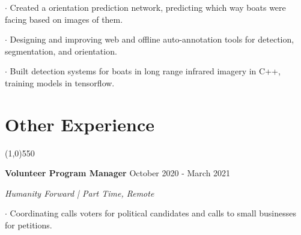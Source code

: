 \documentclass[11pt]{article} %
\begin{document}
		$\boldsymbol{\cdot}$ Created a orientation prediction network, predicting which way boats were facing based on images of them. \par \vspace{+1ex}
		$\boldsymbol{\cdot}$ Designing and improving web and offline auto-annotation tools for detection, segmentation, and orientation.\par \vspace{+1ex}
		$\boldsymbol{\cdot}$ Built detection systems for boats in long range infrared imagery in C++, training models in tensorflow. \par \vspace{+1ex}
    \vspace{+0ex}
	\setlength{\itemindent}{0in}
	\vspace{-3ex}
		\section*{Other Experience}
	\vspace{-7ex}
	\begin{center}
    \line(1,0){550}
    \end{center}
	\vspace{-1ex}
        \textbf{\large Volunteer Program Manager} \hfill October 2020 - March 2021
    \setlength{\parindent}{-0ex} \par
    \textit{Humanity Forward | Part Time, Remote} \vspace{+1ex} \par
    $\boldsymbol{\cdot}$ Coordinating calls voters for political candidates and calls to small businesses for petitions. \par \vspace{+1ex}
	\vspace{-3ex}
\end{document}
